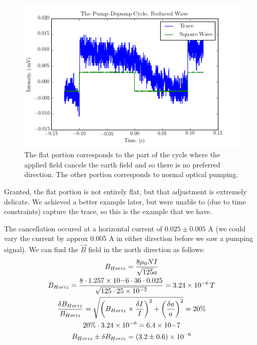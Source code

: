 \documentclass{article}
\DeclarePairedDelimiter{\parens}{\lparen}{\rparen}
\begin{document}
    \begin{figure}[!htb]
      \centering
      \includegraphics[scale=.75]{../plots/reduced_wave.png}
      \caption{The flat portion corresponds to the part of the cycle where the applied field cancels the earth field and so there is no preferred direction.  The other portion corresponds to normal optical pumping.}
    \end{figure}

    Granted, the flat portion is not entirely flat, but that adjustment is extremely delicate.  We achieved a better example later, but were unable to (due to time constraints) capture the trace, so this is the example that we have.

    \hspace{.25cm}

    The cancellation occured at a horizontal current of $0.025 \pm 0.005$ A (we could vary the current by approx 0.005 A in either direction before we saw a pumping signal).  We can find the $\vec{B}$ field in the north direction as follows:
    \begin{gather*}
      B_{Horiz} = \frac{8 \mu_0 N I}{\sqrt{125} a} \\
      B_{Horiz} = \frac{8 \cdot 1.257\times10{-6} \cdot 36 \cdot 0.025}{\sqrt{125 \cdot 25\times10^{-2}}} = 3.24\times10^{-6} \, T \\
      \frac{\delta B_{Horiz}}{B_{Horiz}} = \sqrt{\parens*{B_{Horiz}\times\frac{\delta I}{I}}^2 + \parens*{\frac{\delta a}{a}}^2} = 20\% \\
      20\%\cdot 3.24\times10^{-6} = 6.4\times10{-7} \\
      B_{Horiz} \pm \delta B_{Horiz} = (3.2 \pm 0.6) \times 10^{-6}
    \end{gather*}
\end{document}
